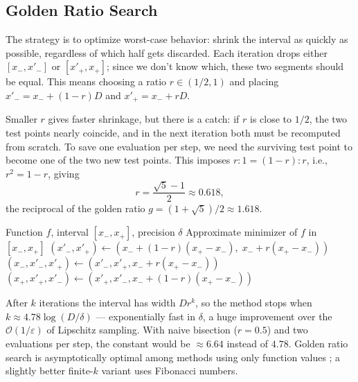 \subsection{Golden Ratio Search}\label{ssec:golden-ratio}

The strategy is to optimize worst-case behavior: shrink the interval as quickly as possible, regardless of which half gets discarded.
Each iteration drops either $[x_-, x'_-]$ or $[x'_+, x_+]$; since we don't know which, these two segments should be equal.
This means choosing a ratio $r \in (1/2, 1)$ and placing $x'_- = x_- + (1-r)D$ and $x'_+ = x_- + rD$.

Smaller $r$ gives faster shrinkage, but there is a catch: if $r$ is close to $1/2$, the two test points nearly coincide, and in the next iteration both must be recomputed from scratch.
To save one evaluation per step, we need the surviving test point to become one of the two new test points.
This imposes $r : 1 = (1 - r) : r$, i.e., $r^2 = 1 - r$, giving
\begin{equation}\label{eq:golden-ratio}
	r = \frac{\sqrt{5} - 1}{2} \approx 0.618,
\end{equation}
the reciprocal of the golden ratio $g = (1 + \sqrt{5})/2 \approx 1.618$.

\begin{algorithm}
	\caption{Golden Ratio Search (GRS)}
	\label{alg:GRS}
	\begin{algorithmic}[1]
		\Require Function $f$, interval $[x_-, x_+]$, precision $\delta$
		\Ensure Approximate minimizer of $f$ in $[x_-, x_+]$
			\State $(x'_-, x'_+) \gets (x_- + (1-r)(x_+ - x_-),\; x_- + r(x_+ - x_-))$
					\State $(x_-, x'_-, x'_+) \gets (x'_-, x'_+, x_- + r(x_+ - x_-))$
				\Else
					\State $(x_+, x'_+, x'_-) \gets (x'_+, x'_-, x_- + (1-r)(x_+ - x_-))$
				\EndIf
			\EndWhile
		\EndProcedure
	\end{algorithmic}
\end{algorithm}

After $k$ iterations the interval has width $D r^k$, so the method stops when $k \approx 4.78 \log(D / \delta)$ --- exponentially fast in $\delta$, a huge improvement over the $\mathcal{O}(1/\varepsilon)$ of Lipschitz sampling.
With naive bisection ($r = 0.5$) and two evaluations per step, the constant would be $\approx 6.64$ instead of $4.78$.
Golden ratio search is asymptotically optimal among methods using only function values \cite{bazaraa2006}; a slightly better finite-$k$ variant uses Fibonacci numbers.

